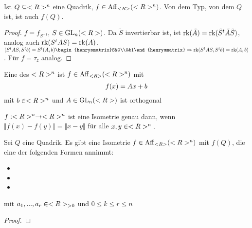 \begin{lemma}
	Ist $Q\subseteq<R>^n$ eine Quadrik, $f\in\operatorname{Aff}_{<R>}(<R>^n)$. Von dem Typ, von dem $Q$ ist, ist auch $f(Q)$.
\end{lemma}
\begin{proof}
	$f=f_{S^{-1}}$, $S\in\operatorname{GL}_n(<R>)$. Da $\tilde{S}$ invertierbar ist, ist $\operatorname{rk}(\tilde{A})= \operatorname{rk}(\tilde{S}^t\tilde{A}\tilde{S})$, analog auch $\operatorname{rk}(S^tAS)=\operatorname{rk}(A)$. \\
	$(S^tAS,S^tb)=S^t(A,b)\begin{henrysmatrix}S&0\\0&1\end{henrysmatrix}\Rightarrow \rk(S^tAS,S^tb)=\rk(A,b)$. Für $f=\tau_z$ analog.
\end{proof}

\begin{definition}[Isometrie]
	Eine  des $<R>^n$ ist $f\in\operatorname{Aff}_{<R>}(<R>^n)$ mit
	\begin{align}
		f(x)=Ax+b\notag
	\end{align}
	mit $b\in<R>^n$ und $A\in\operatorname{GL}_n(<R>)$ ist orthogonal
\end{definition}

\begin{remark}
	$f:<R>^n\to<R>^n$ ist eine Isometrie genau dann, wenn $\Vert f(x)-f(y)\Vert=\Vert x-y\Vert$ für alle $x,y\in<R>^n.$
\end{remark}

\begin{theorem}
	Sei $Q$ eine Quadrik. Es gibt eine Isometrie $f\in\operatorname{Aff}_{<R>}(<R>^n)$ mit $f(Q)$, die eine der folgenden Formen annimmt:
	\begin{itemize}
		\item {}
		\item {}
		\item {}
	\end{itemize}
	mit $a_1,...,a_r\in<R>_{>0}$ und $0\le k\le r\le n$
\end{theorem}
\begin{proof}
	
\end{proof}

